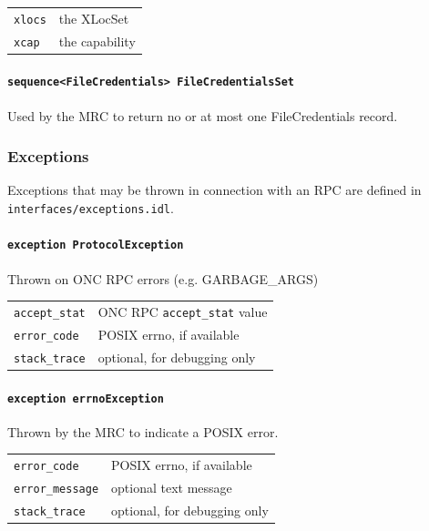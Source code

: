 \begin{tabularx}{\textwidth}{lX}
 \texttt{xlocs} & the XLocSet\\
 \texttt{xcap} & the capability\\
\end{tabularx}


\paragraph{\texttt{sequence<FileCredentials> FileCredentialsSet}}
Used by the MRC to return no or at most one FileCredentials record.





\subsubsection{Exceptions}

Exceptions that may be thrown in connection with an RPC are defined in \texttt{interfaces/exceptions.idl}.

\paragraph{\texttt{exception ProtocolException}}
Thrown on ONC RPC errors (e.g. GARBAGE\_ARGS)

\begin{tabularx}{\textwidth}{lX}
 \texttt{accept\_stat} & ONC RPC\index{ONC RPC} \texttt{accept\_stat} value\\
 \texttt{error\_code} & POSIX\index{POSIX} errno, if available\\
 \texttt{stack\_trace} & optional, for debugging only
\end{tabularx}


\paragraph{\texttt{exception errnoException}}
Thrown by the MRC to indicate a POSIX error.

\begin{tabularx}{\textwidth}{lX}
 \texttt{error\_code} & POSIX\index{POSIX} errno, if available\\
 \texttt{error\_message} & optional text message\\
 \texttt{stack\_trace} & optional, for debugging only
\end{tabularx}


